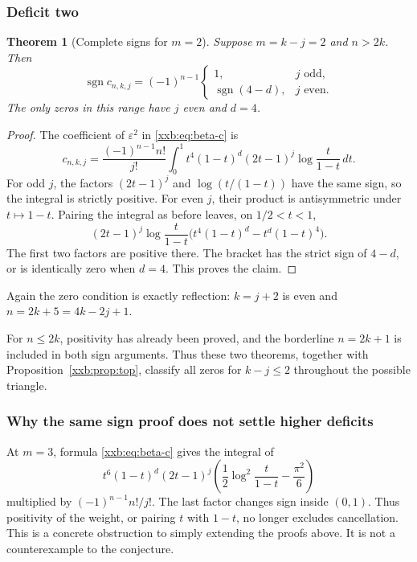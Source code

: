 \documentclass[11pt,a4paper]{article}
\numberwithin{equation}{section}
\newtheorem{theorem}{Theorem}[section]
\theoremstyle{definition}
\theoremstyle{remark}
\theoremstyle{plain}
\DeclareMathOperator{\sgn}{sgn}
\begin{document}
\subsubsection{Deficit two}
\begin{theorem}[Complete signs for $m=2$]\label{xxb:thm:m2}
Suppose $m=k-j=2$ and $n>2k$. Then
\begin{equation}\label{xxb:eq:m2-sign}
 \sgn c_{n,k,j}=(-1)^{n-1}
 \begin{cases}
 1,&j\text{ odd},\\
 \sgn(4-d),&j\text{ even}.
 \end{cases}
\end{equation}
The only zeros in this range have $j$ even and $d=4$.
\end{theorem}
\begin{proof}
The coefficient of $\varepsilon^2$ in \eqref{xxb:eq:beta-c} is
\begin{equation}\label{xxb:eq:m2-integral}
 c_{n,k,j}=\frac{(-1)^{n-1}n!}{j!}
 \int_0^1t^4(1-t)^d(2t-1)^j
       \log\frac{t}{1-t}\,dt.
\end{equation}
For odd $j$, the factors $(2t-1)^j$ and $\log(t/(1-t))$ have the same
sign, so the integral is strictly positive. For even $j$, their product
is antisymmetric under $t\mapsto1-t$. Pairing the integral as before
leaves, on $1/2<t<1$,
\[
 (2t-1)^j\log\frac{t}{1-t}
 \bigl(t^4(1-t)^d-t^d(1-t)^4\bigr).
\]
The first two factors are positive there. The bracket has the strict
sign of $4-d$, or is identically zero when $d=4$. This proves the claim.
\end{proof}
Again the zero condition is exactly reflection: $k=j+2$ is even and
$n=2k+5=4k-2j+1$.

For $n\le2k$, positivity has already been proved, and the borderline
$n=2k+1$ is included in both sign arguments. Thus these two theorems,
together with Proposition~\ref{xxb:prop:top}, classify all zeros for
$k-j\le2$ throughout the possible triangle.

\subsubsection{Why the same sign proof does not settle higher deficits}
At $m=3$, formula \eqref{xxb:eq:beta-c} gives the integral of
\begin{equation}\label{xxb:eq:m3-kernel}
 t^6(1-t)^d(2t-1)^j
 \left(\frac12\log^2\frac{t}{1-t}-\frac{\pi^2}{6}\right)
\end{equation}
multiplied by $(-1)^{n-1}n!/j!$. The last factor changes sign inside
$(0,1)$. Thus positivity of the weight, or pairing $t$ with $1-t$, no
longer excludes cancellation. This is a concrete obstruction to simply
extending the proofs above. It is not a counterexample to the conjecture.
\end{document}
